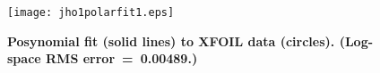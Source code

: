 \begin{figure}[H]
	\begin{center}
	\texttt{[image: jho1polarfit1.eps]}
    \caption{\textbf{Posynomial fit (solid lines) to XFOIL data (circles).  (Log-space RMS error~=~0.00489.)}}
	\label{f:JH01polar}
	\end{center}
\end{figure}

% 
% 
% 
% 

